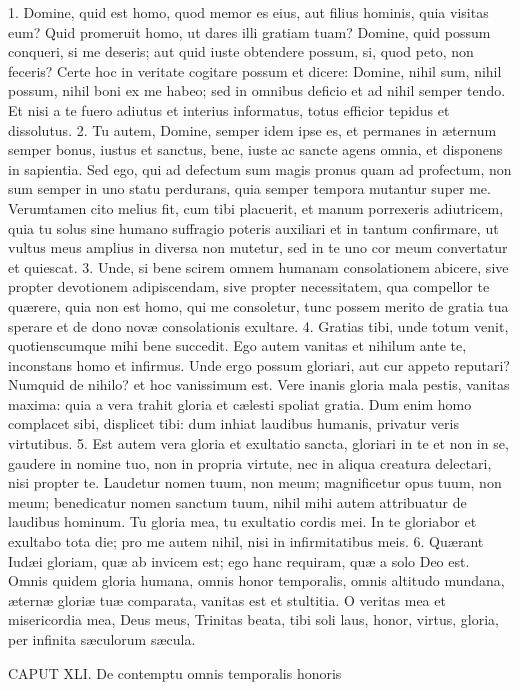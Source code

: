 1. Domine, quid est homo, quod memor es eius, aut filius hominis, quia visitas eum? Quid promeruit homo, ut dares illi gratiam tuam? Domine, quid possum conqueri, si me deseris; aut quid iuste obtendere possum, si, quod peto, non feceris? Certe hoc in veritate cogitare possum et dicere: Domine, nihil sum, nihil possum, nihil boni ex me habeo; sed in omnibus deficio et ad nihil semper tendo. Et nisi a te fuero adiutus et interius informatus, totus efficior tepidus et dissolutus.
2. Tu autem, Domine, semper idem ipse es, et permanes in æternum semper bonus, iustus et sanctus, bene, iuste ac sancte agens omnia, et disponens in sapientia. Sed ego, qui ad defectum sum magis pronus quam ad profectum, non sum semper in uno statu perdurans, quia semper tempora mutantur super me. Verumtamen cito melius fit, cum tibi placuerit, et manum porrexeris adiutricem, quia tu solus sine humano suffragio poteris auxiliari et in tantum confirmare, ut vultus meus amplius in diversa non mutetur, sed in te uno cor meum convertatur et quiescat.
3. Unde, si bene scirem omnem humanam consolationem abicere, sive propter devotionem adipiscendam, sive propter necessitatem, qua compellor te quærere, quia non est homo, qui me consoletur, tunc possem merito de gratia tua sperare et de dono novæ consolationis exultare.
4. Gratias tibi, unde totum venit, quotienscumque mihi bene succedit. Ego autem vanitas et nihilum ante te, inconstans homo et infirmus. Unde ergo possum gloriari, aut cur appeto reputari? Numquid de nihilo? et hoc vanissimum est. Vere inanis gloria mala pestis, vanitas maxima: quia a vera trahit gloria et cælesti spoliat gratia. Dum enim homo complacet sibi, displicet tibi: dum inhiat laudibus humanis, privatur veris virtutibus.
5. Est autem vera gloria et exultatio sancta, gloriari in te et non in se, gaudere in nomine tuo, non in propria virtute, nec in aliqua creatura delectari, nisi propter te. Laudetur nomen tuum, non meum; magnificetur opus tuum, non meum; benedicatur nomen sanctum tuum, nihil mihi autem attribuatur de laudibus hominum. Tu gloria mea, tu exultatio cordis mei. In te gloriabor et exultabo tota die; pro me autem nihil, nisi in infirmitatibus meis.
6. Quærant Iudæi gloriam, quæ ab invicem est; ego hanc requiram, quæ a solo Deo est. Omnis quidem gloria humana, omnis honor temporalis, omnis altitudo mundana, æternæ gloriæ tuæ comparata, vanitas est et stultitia. O veritas mea et misericordia mea, Deus meus, Trinitas beata, tibi soli laus, honor, virtus, gloria, per infinita sæculorum sæcula.


CAPUT XLI.
De contemptu omnis temporalis honoris

